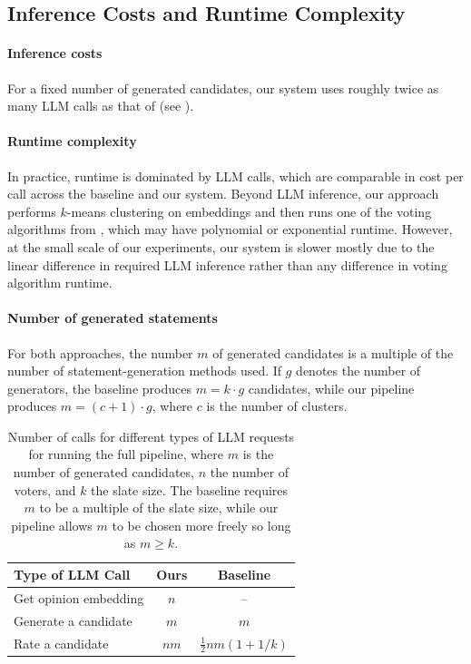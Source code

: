 \documentclass[11pt]{article}
\begin{document}
\subsection{Inference Costs and Runtime Complexity}

\paragraph{Inference costs}
For a fixed number of generated candidates, our system uses roughly twice as many LLM calls as that of \citet{fish-v2} (see ).

\paragraph{Runtime complexity}
In practice, runtime is dominated by LLM calls, which are comparable in cost per call across the baseline and our system. Beyond LLM inference, our approach performs \(k\)-means clustering on embeddings and then runs one of the voting algorithms from , which may have polynomial or exponential runtime. However, at the small scale of our experiments, our system is slower mostly due to the linear difference in required LLM inference rather than any difference in voting algorithm runtime.

\paragraph{Number of generated statements}
For both approaches, the number \(m\) of generated candidates is a multiple of the number of statement-generation methods used. If \(g\) denotes the number of generators, the baseline produces \(m=k\cdot g\) candidates, while our pipeline produces \(m=(c+1)\cdot g\), where \(c\) is the number of clusters.

\begin{table}[t]
\centering
\begin{tabular}{lcc}
\hline
Type of LLM Call & Ours & Baseline \citep{fish-v2} \\
\hline
Get opinion embedding & $n$ & -- \\
Generate a candidate & $m$ & $m$ \\
Rate a candidate & $nm$ & $\frac{1}{2} n m (1 + 1/k)$ \\
\hline
\end{tabular}
\caption{Number of calls for different types of LLM requests for running the full pipeline, where \(m\) is the number of generated candidates, \(n\) the number of voters, and \(k\) the slate size. The baseline requires \(m\) to be a multiple of the slate size, while our pipeline allows \(m\) to be chosen more freely so long as \(m\ge k\).}
\label{tab:llm-call-comparison}
\end{table}
\end{document}
